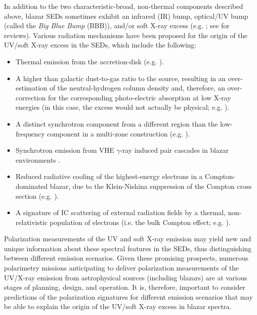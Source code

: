 \documentclass[twocolumn, tighten, twocolappendix]{aastex63}
\begin{document}
In addition to the two characteristic-broad, non-thermal components described above, blazar SEDs sometimes exhibit an infrared (IR) bump, optical/UV bump (called the \textit{Big Blue Bump} (BBB)), and/or soft X-ray excess (e.g. \cite{Masnou_etal1992, Grandi_etal1997, Haardt_etal1998, Pian_etal1999, Raiteri_etal2005, Palma_etal2011, Ackermann_etal2012, Paliya_etal2015, Pal_etal2020}; see \cite{Antonucci_2002, Perlman_etal2008} for reviews). Various radiation mechanisms have been proposed for the origin of the UV/soft X-ray excess in the SEDs, which include the following:
\begin{itemize}
     \item Thermal emission from the accretion-disk (e.g. \cite{Pian_etal1999, Blaes_etal2001, Paliya_etal2015, Pal_etal2020}). \\
     \item A higher than galactic dust-to-gas ratio to the source, resulting in an over-estimation of the neutral-hydrogen column density and, therefore, an over-correction for the corresponding photo-electric absorption at low X-ray energies (in this case, the excess would not actually be physical; e.g. \cite{Ravasio_etal2003}).
     \item A distinct synchrotron component from a different region than the low-frequency component in a multi-zone construction (e.g. \cite{Paltani_etal1998, Ostorero_etal2004, Raiteri_etal2005}). 
     \item Synchrotron emission from VHE $\gamma$-ray induced pair cascades in blazar environments \citep{Roustazadeh_Botther_2012}.
     \item Reduced radiative cooling of the highest-energy electrons in a Compton-dominated blazar, due to the Klein-Nishina suppression of the Compton cross section (e.g. \cite{Ravasio_etal2003, Moderski_etal2005}).
     \item A signature of IC scattering of external radiation fields by a thermal, non-relativistic population of electrons (i.e. the bulk Compton effect; e.g. \cite{Sikora_etal1994, Sikora_etal1997, Blazejowski_etal2000, Ackermann_etal2012, Baring_etal2017}). 
 \end{itemize}
 Polarization measurements of the UV and soft X-ray emission may yield new and unique information about these spectral features in the SEDs, thus distinguishing between different emission scenarios. Given these promising prospects, numerous polarimetry missions anticipating to deliver polarization measurements of the UV/X-ray emission from astrophysical sources (including blazars) are at various stages of planning, design, and operation. It is, therefore, important to consider predictions of the polarization signatures for different emission scenarios that may be able to explain the origin of the UV/soft X-ray excess in blazar spectra. 
\end{document}
